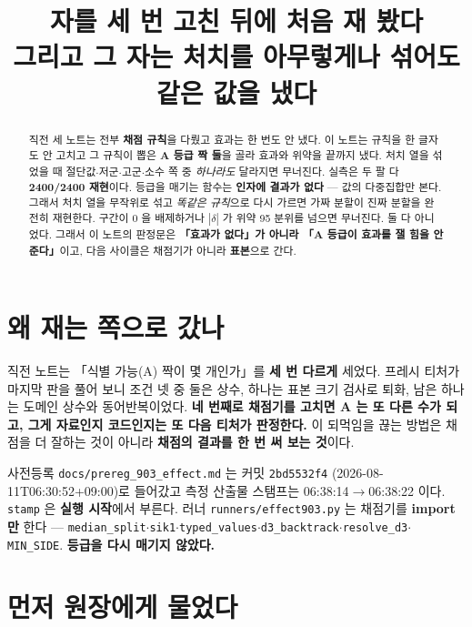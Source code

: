 \documentclass{article}
\title{자를 세 번 고친 뒤에 처음 재 봤다 \\
  {\large 그리고 그 자는 처치를 아무렇게나 섞어도 같은 값을 냈다}}
\begin{document}
\maketitle

\begin{abstract}
직전 세 노트는 전부 \textbf{채점 규칙}을 다뤘고 효과는 한 번도 안 냈다.
이 노트는 규칙을 한 글자도 안 고치고 그 규칙이 뽑은 \textbf{A 등급 짝 둘}을 골라
효과와 위약을 끝까지 냈다.
{처치 열을 섞었을 때 절단값$\cdot$저군$\cdot$고군$\cdot$소수 쪽 중 \emph{하나라도} 달라지면 무너진다.
실측은 두 팔 다 \textbf{2400/2400 재현}이다.}
등급을 매기는 함수는 \textbf{인자에 결과가 없다} --- 값의 다중집합만 본다.
그래서 처치 열을 무작위로 섞고 \emph{똑같은 규칙}으로 다시 가르면
가짜 분할이 진짜 분할을 완전히 재현한다.
{구간이 0 을 배제하거나 $|\delta|$ 가 위약 95 분위를 넘으면 무너진다. 둘 다 아니었다.}
그래서 이 노트의 판정문은 \textbf{「효과가 없다」가 아니라 「A 등급이 효과를 잴 힘을 안 준다」}이고,
다음 사이클은 채점기가 아니라 \textbf{표본}으로 간다.
\end{abstract}

\section{왜 재는 쪽으로 갔나}

직전 노트는 「식별 가능(A) 짝이 몇 개인가」를 \textbf{세 번 다르게} 세었다.
프레시 티처가 마지막 판을 풀어 보니 조건 넷 중 둘은 상수, 하나는 표본 크기 검사로 퇴화,
남은 하나는 도메인 상수와 동어반복이었다.
\textbf{네 번째로 채점기를 고치면 A 는 또 다른 수가 되고, 그게 자료인지 코드인지는 또 다음 티처가 판정한다.}
이 되먹임을 끊는 방법은 채점을 더 잘하는 것이 아니라 \textbf{채점의 결과를 한 번 써 보는 것}이다.

사전등록 \texttt{docs/prereg\_903\_effect.md} 는 커밋 \texttt{2bd5532f4}
(2026-08-11T06:30:52+09:00)로 들어갔고 측정 산출물 스탬프는 06:38:14$\to$06:38:22 이다.
\texttt{stamp} 은 \textbf{실행 시작}에서 부른다.
러너 \texttt{runners/effect903.py} 는 채점기를 \textbf{import 만} 한다 ---
\texttt{median\_split}$\cdot$\texttt{sik1}$\cdot$\texttt{typed\_values}$\cdot$\texttt{d3\_backtrack}$\cdot$\texttt{resolve\_d3}$\cdot$\texttt{MIN\_SIDE}.
\textbf{등급을 다시 매기지 않았다.}

\section{먼저 원장에게 물었다}
\end{document}
